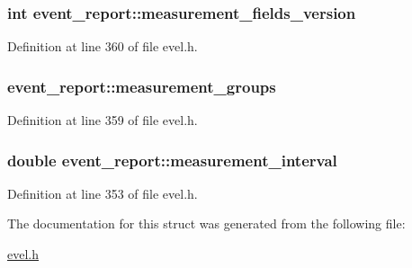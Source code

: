 \subsubsection[{measurement\+\_\+fields\+\_\+version}]{\setlength{\rightskip}{0pt plus 5cm}int event\+\_\+report\+::measurement\+\_\+fields\+\_\+version}\label{structevent__report_abeb856adaab0580ff115ed65dd8839a9}


Definition at line 360 of file evel.\+h.

\hypertarget{structevent__report_a1b6ed94783d22c55051a4d52eebb7686}{}
\subsubsection[{measurement\+\_\+groups}]{ event\+\_\+report\+::measurement\+\_\+groups}\label{structevent__report_a1b6ed94783d22c55051a4d52eebb7686}


Definition at line 359 of file evel.\+h.

\hypertarget{structevent__report_add26cd9f3bbc2c88cd0ff774bfa3c9cd}{}
\subsubsection[{measurement\+\_\+interval}]{\setlength{\rightskip}{0pt plus 5cm}double event\+\_\+report\+::measurement\+\_\+interval}\label{structevent__report_add26cd9f3bbc2c88cd0ff774bfa3c9cd}


Definition at line 353 of file evel.\+h.



The documentation for this struct was generated from the following file\+:\begin{DoxyCompactItemize}
\item 
\hyperlink{evel_8h}{evel.\+h}\end{DoxyCompactItemize}
